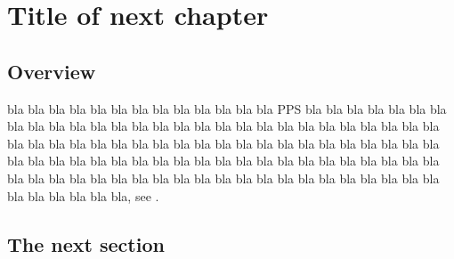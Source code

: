 
\lhead[\chaptername~\thechapter]{\rightmark}


\rhead[\leftmark]{}


\lfoot[\thepage]{}


\cfoot{}


\rfoot[]{\thepage}


\chapter{Title of next chapter}


\section{Overview}

bla bla bla bla bla bla bla bla bla bla bla bla bla PPS
bla bla bla bla bla bla bla bla bla bla bla bla bla bla bla bla bla
bla bla bla bla bla bla bla bla bla bla bla bla bla bla bla bla bla
bla bla bla bla bla bla bla bla bla bla bla bla bla bla bla bla bla
bla bla bla bla bla bla bla bla bla bla bla bla bla bla bla bla bla
bla bla bla bla bla bla bla bla bla bla bla bla bla bla bla bla bla
bla bla bla bla bla bla bla bla bla bla bla bla, see \cite{Rich1921,Marq1963}.


\section{The next section}


